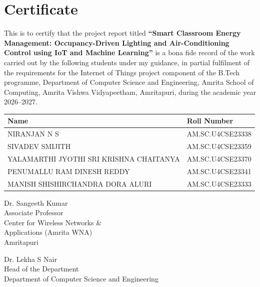 \documentclass[12pt,a4paper,oneside]{report}
\newcommand{\reporttitle}{Smart Classroom Energy Management: Occupancy-Driven Lighting and Air-Conditioning Control using IoT and Machine Learning}
\begin{document}
\thispagestyle{empty}\null\clearpage

\setcounter{page}{2}
\pagestyle{plain}

\chapter*{Certificate}
This is to certify that the project report titled \textbf{``\reporttitle''} is a bona fide record of the work carried
out by the following students under my guidance, in partial fulfilment of the requirements for the Internet of Things
project component of the B.Tech programme, Department of Computer Science and Engineering, Amrita School of
Computing, Amrita Vishwa Vidyapeetham, Amritapuri, during the academic year 2026--2027.

\vspace{6mm}
\begin{center}
\begin{tabular}{ll}
\toprule
\textbf{Name} & \textbf{Roll Number}\\
\midrule
NIRANJAN N S & AM.SC.U4CSE23338\\
SIVADEV SMIJITH & AM.SC.U4CSE23359\\
YALAMARTHI JYOTHI SRI KRISHNA CHAITANYA & AM.SC.U4CSE23370\\
PENUMALLU RAM DINESH REDDY & AM.SC.U4CSE23341\\
MANISH SHISHIRCHANDRA DORA ALURI & AM.SC.U4CSE23333\\
\bottomrule
\end{tabular}
\end{center}

\vspace{18mm}
\noindent
\begin{minipage}[t]{0.52\textwidth}
Dr. Sangeeth Kumar\\
Associate Professor\\
Center for Wireless Networks \&\\ Applications (Amrita WNA)\\
Amritapuri
\end{minipage}\hfill
\begin{minipage}[t]{0.44\textwidth}
Dr. Lekha S Nair\\
Head of the Department\\
Department of Computer Science and Engineering
\end{minipage}
\end{document}
